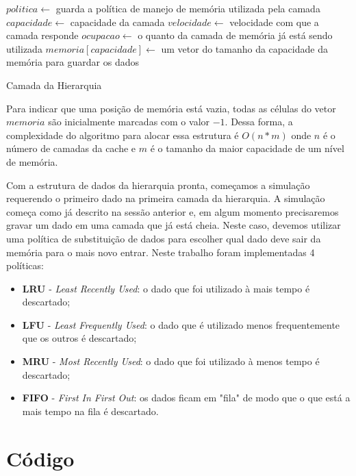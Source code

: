 \documentclass[12pt]{article}
\begin{document}
\begin{algorithm}[h!]
\begin{footnotesize}
$politica\longleftarrow$ guarda a política de manejo de memória utilizada pela camada\;
$capacidade\longleftarrow$ capacidade da camada\;
$velocidade\longleftarrow$ velocidade com que a camada responde\;
$ocupacao\longleftarrow$ o quanto da camada de memória já está sendo utilizada\;
$memoria[capacidade]\longleftarrow$ um vetor do tamanho da capacidade da memória para guardar os dados\;
\caption{Camada da Hierarquia}
\end{footnotesize}
\end{algorithm}

Para indicar que uma posição de memória está vazia, todas as células do vetor $memoria$ são inicialmente marcadas com o valor
$-1$. Dessa forma, a complexidade do algoritmo para alocar essa estrutura é $O(n * m)$ onde $n$ é o número de camadas da cache
e $m$ é o tamanho da maior capacidade de um nível de memória.

Com a estrutura de dados da hierarquia pronta, começamos a simulação requerendo o primeiro dado na primeira camada da 
hierarquia. A simulação começa como já descrito na sessão anterior e, em algum momento precisaremos gravar um dado em uma
camada que já está cheia. Neste caso, devemos utilizar uma política de substituição de dados para escolher qual dado deve 
sair da memória para o mais novo entrar. Neste trabalho foram implementadas 4 políticas:

\begin{itemize}
  \item \textbf{LRU} - \textit{Least Recently Used}: o dado que foi utilizado à mais tempo é descartado;
  \item \textbf{LFU} - \textit{Least Frequently Used}: o dado que é utilizado menos frequentemente que os outros é 
  descartado;
  \item \textbf{MRU} - \textit{Most Recently Used}: o dado que foi utilizado à menos tempo é descartado;
  \item \textbf{FIFO} - \textit{First In First Out}: os dados ficam em "fila" de modo que o que está a mais tempo na fila
  é descartado.
\end{itemize}

\section{Código}
\end{document}
